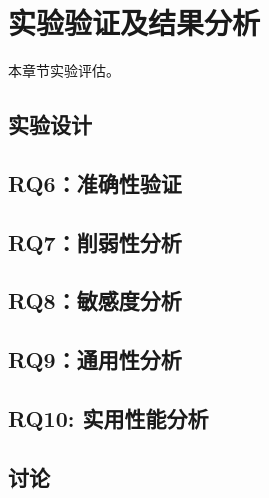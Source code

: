 \chapter{实验验证及结果分析}

本章节实验评估。

\section{实验设计}

\section{RQ6：准确性验证}

\section{RQ7：削弱性分析}

\section{RQ8：敏感度分析}

\section{RQ9：通用性分析}

\section{RQ10: 实用性能分析}

\section{讨论}
